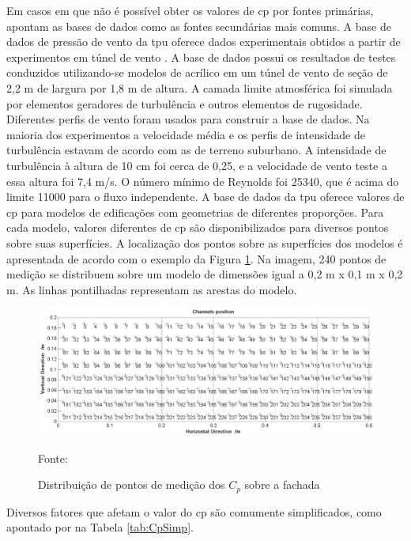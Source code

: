 \documentclass[brazil,hardcopy,openany]{ufscthesis} %
\newcommand{\source}[1]{\small \caption*{Fonte: {#1}} } %
\begin{document}
Em casos em que não é possível obter os valores de \acrshort{cp} por fontes primárias,  apontam as bases de dados como as fontes secundárias mais comuns.
A base de dados de pressão de vento da \acrfull{tpu} oferece dados experimentais obtidos a partir de experimentos em túnel de vento \cite{TPU2018}.
A base de dados possui os resultados de testes conduzidos utilizando-se modelos de acrílico em um túnel de vento de seção de 2,2 m de largura por 1,8 m de altura.
A camada limite atmosférica foi simulada por elementos geradores de turbulência e outros elementos de rugosidade. Diferentes perfis de vento foram usados para construir a base de dados. Na maioria dos experimentos a velocidade média e os perfis de intensidade de turbulência estavam de acordo com as de terreno suburbano. A intensidade de turbulência à altura de 10 cm foi cerca de 0,25, e a velocidade de vento teste a essa altura foi 7,4 m/s. O número mínimo de Reynolds foi 25340, que é acima do limite 11000 para o fluxo independente.
A base de dados da \acrshort{tpu} oferece valores de \acrshort{cp} para modelos de edificações com geometrias de diferentes proporções. Para cada modelo, valores diferentes de \acrshort{cp} são disponibilizados para diversos pontos sobre suas superfícies. 
A localização dos pontos sobre as superfícies dos modelos é apresentada de acordo com o exemplo da Figura \ref{fig:TPU_points}. Na imagem, 240 pontos de medição se distribuem sobre um modelo de dimensões igual a 0,2 m x 0,1 m x 0,2 m. As linhas pontilhadas representam as arestas do modelo.


\begin{figure}[h]
	\centering
	\caption{Distribuição de pontos de medição dos $C_p$ sobre a fachada}
	\includegraphics[width=1\linewidth]{img/tpu_points.png}
	\label{fig:TPU_points}
	\source{}
\end{figure}

Diversos fatores que afetam o valor do \acrshort{cp} são comumente simplificados, como apontado por  na Tabela \ref{tab:CpSimp}.
\end{document}
